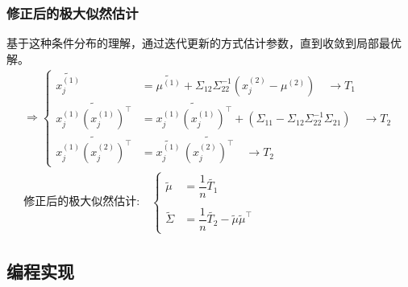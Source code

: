 \documentclass{article} %
\begin{document}
    \subsubsection{修正后的极大似然估计}
    基于这种条件分布的理解，通过迭代更新的方式估计参数，直到收敛到局部最优解。
    \[
        \begin{gathered}
            \Rightarrow \begin{cases}
                \widetilde{x_j^{(1)}} &= \widetilde{\mu^{(1)}}+\Sigma_{12} \Sigma_{22}^{-1} (x_j^{(2)}-\mu^{(2)}) \quad \rightarrow T_1\\
                \widetilde{x_j^{(1)}(x_j^{(1)})^\top} &=\widetilde{x_j^{(1)}(x_j^{(1)})^\top}+ (\Sigma_{11} - \Sigma_{12} \Sigma_{22}^{-1} \Sigma_{21}) \quad \rightarrow T_2 \\
                \widetilde{x_j^{(1)}(x_j^{(2)})^\top}&=\widetilde{x_j^{(1)}} \, \widetilde{(x_j^{(2)})^\top} \quad \rightarrow T_2
            \end{cases}\\
            \text{修正后的极大似然估计:}\quad
            \begin{cases}
                \widetilde{\mu} &= \dfrac{1}{n}\widetilde{T_1} \\
                \\
                \widetilde{\Sigma} &= \dfrac{1}{n} \widetilde{T_2} - \widetilde{\mu}\widetilde{\mu}^\top
            \end{cases}
        \end{gathered}
    \]
\newpage
\subsection{编程实现}
\end{document}
